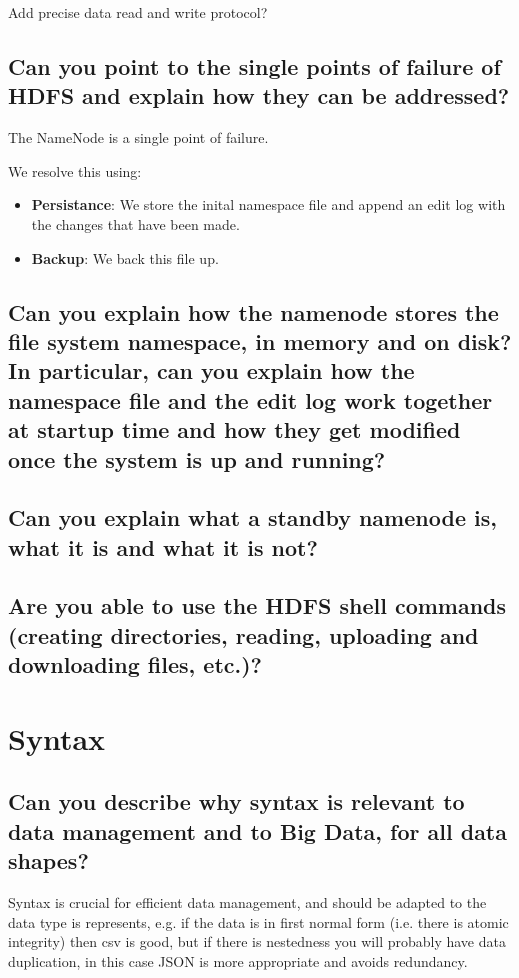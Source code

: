 \documentclass{article}
\begin{document}
{\color{red} Add precise data read and write protocol?}

\subsection{Can you point to the single points of failure of HDFS and explain how they can be addressed?}

The NameNode is a single point of failure. 

We resolve this using: 

\begin{itemize}
    \item \textbf{Persistance}: We store the inital namespace file and append an edit log with the changes that have been made. 
    \item \textbf{Backup}: We back this file up. 
\end{itemize}


\subsection{Can you explain how the namenode stores the file system namespace, in memory and on disk? In particular, can you explain how the namespace file and the edit log work together at startup time and how they get modified once the system is up and running?}
\subsection{Can you explain what a standby namenode is, what it is and what it is not?}
\subsection{Are you able to use the HDFS shell commands (creating directories, reading, uploading and downloading files, etc.)?}

\pagebreak

\section{Syntax}
\subsection{Can you describe why syntax is relevant to data management and to Big Data, for all data shapes?}

Syntax is crucial for efficient data management, and should be adapted to the data type is represents, e.g. if the data is in first normal form (i.e. there is atomic integrity) then csv is good, but if there is nestedness you will probably have data duplication, in this case JSON is more appropriate and avoids redundancy.
\end{document}
